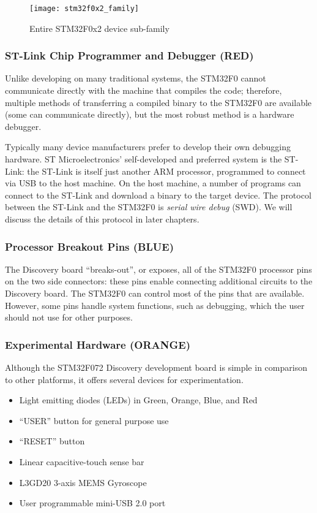 \documentclass[openany,11pt,fleqn]{book} %
\begin{document}
\begin{figure}[]
	\centering\texttt{[image: stm32f0x2\_family]}
	\caption{Entire STM32F0x2 device sub-family}
	\label{f072_family}
\end{figure}

\subsubsection*{ST-Link Chip Programmer and Debugger ({\color{red!90!black}RED})}
Unlike developing on many traditional systems, the STM32F0 cannot communicate directly with the machine that compiles the code; therefore, multiple methods of transferring a compiled binary to the STM32F0 are available (some can communicate directly), but the most robust method is a hardware debugger.

Typically many device manufacturers prefer to develop their own debugging hardware. ST Microelectronics' self-developed and preferred system is the ST-Link: the ST-Link is itself just another ARM processor, programmed to connect via USB to the host machine. On the host machine, a number of programs can connect to the ST-Link and download a binary to the target device. The protocol between the ST-Link and the STM32F0 is \textit{serial wire debug} (SWD).  We will discuss the details of this protocol in later chapters.

\subsubsection*{Processor Breakout Pins ({\color{blue!90!black}BLUE})}	

The Discovery board ``breaks-out'', or exposes, all of the STM32F0 processor pins on the two side connectors: these pins enable connecting additional circuits to the Discovery board. The STM32F0 can control most of the pins that are available. However, some pins handle system functions, such as debugging, which the user should not use for other purposes. 
\newpage
\subsubsection*{Experimental Hardware  ({\color{orange!90!black}ORANGE})}
Although the STM32F072 Discovery development board is simple in comparison to other platforms, it offers several devices for experimentation.

\begin{itemize}
	\item Light emitting diodes (LEDs) in Green, Orange, Blue, and Red
	\item ``USER'' button for general purpose use
	\item ``RESET'' button
	\item Linear capacitive-touch sense bar
	\item L3GD20 3-axis MEMS Gyroscope
	\item User programmable mini-USB 2.0 port
\end{itemize}
\end{document}
